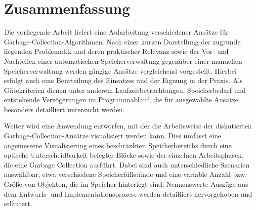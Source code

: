 %
\chapter*{Zusammenfassung}
\label{sec:abstract}
\vspace*{-10mm}

Die vorliegende Arbeit liefert eine Aufarbeitung verschiedener Ansätze für Garbage-Collection-Algorithmen.
Nach einer kurzen Darstellung der zugrunde liegenden Problematik und deren praktischer Relevanz sowie der Vor- und Nachteilen einer automatischen Speicherverwaltung gegenüber einer manuellen Speicherverwaltung werden gängige Ansätze vergleichend vorgestellt.
Hierbei erfolgt auch eine Beurteilung des Einsatzes und der Eignung in der Praxis.
Als Gütekriterien dienen unter anderem Laufzeitbetrachtungen, Speicherbedarf und entstehende Verzögerungen im Programmablauf, die für ausgewählte Ansätze besonders detailliert untersucht werden.

Weiter wird eine Anwendung entworfen, mit der die Arbeitsweise der diskutierten Garbage-Collection-Ansätze visualisiert werden kann.
Dies umfasst eine angemessene Visualisierung eines beschränkten Speicherbereichs durch eine optische Unterscheidbarkeit belegter Blöcke sowie der einzelnen Arbeitsphasen, die eine Garbage Collection ausführt.
Dabei sind auch unterschiedliche Szenarien auswählbar, etwa verschiedene Speicherfüllstände und eine variable Anzahl bzw. Größe von Objekten, die im Speicher hinterlegt sind.
Nennenswerte Auszüge aus dem Entwurfs- und Implementationsprozess werden detailliert hervorgehoben und erläutert.